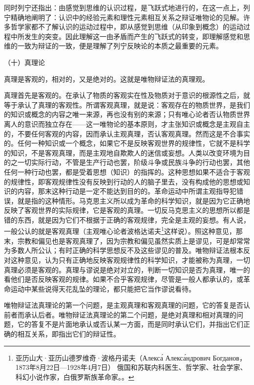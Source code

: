 \documentclass[UTF8, 12pt, a4paper]{ctexrep}
\begin{document}
同时列宁还指出：由感觉到思维的认识过程，是飞跃式地进行的，在这一点上，列宁精确地阐明了：认识中的经验元素和理性元素相互关系之辩证唯物论的见解。许多哲学家都不了解认识的运动过程中，即从感觉到思维（从印象到概念）的运动过程中所发生的突变。因此理解这一由矛盾而产生的飞跃式的转变，即理解感觉和思维的一致为辩证的一致，便是理解了列宁反映论的本质之最重要的元素。

（十）真理论

真理是客观的，相对的，又是绝对的。这就是唯物辩证法的真理观。

真理首先是客观的。在承认了物质的客观实在性及物质对于意识的根源性之后，就等于承认了真理的客观性。所谓客观真理，就是说：客观存在的物质世界，是我们的知识或概念的内容之唯一来源，再也没有别的来源；只有唯心论者否认物质世界离人的意识而独立存在——这一唯物论的基本原则，才主张知识或概念是主观自主的，不要任何客观的内容，因而承认主观真理，否认客观真理。然而这是不合事实的。任何一种知识或一个概念，如果它不是反映客观世界的规律性，它就不是科学的知识，不是客观真理，而是主观地自欺欺人的迷信或妄想。人类以改变环境为目的之一切实际行动，不管是生产行动也罢，阶级斗争或民族斗争的行动也罢，其他任何一种行动也罢，都是受着思想（知识）的指挥的。这种思想如果不适合于客观的规律性，即客观规律性没有反映到行动的人的脑子里去，没有构成他的思想或知识的内容，那末这种行动是一定不能达到目的的。革命运动中所谓主观指导犯错误，就是指的这种情形。马克思主义所以成为革命的科学知识，就是因为它正确地反映了客观世界的实际规律，它是客观的真理。一切反马克思主义的思想所以都是错的东西，就是因为它们不根据于正确的客观规律，完全是主观的妄想。有人说，一般公认的就是客观真理（主观唯心论者波格达诺夫\footnote{亚历山大·亚历山德罗维奇·波格丹诺夫（Алекса́ Алекса́ндрович Богданов，1873年8月22日—1928年4月7日） 俄国和苏联内科医生、哲学家、社会学家、科幻小说作家，白俄罗斯族革命家。。}这样说）。照这种意见，那末，宗教和偏见也是客观真理了，因为宗教和偏见虽然实质上是谬见，可是却常常为多数人所公认；有时正确的科学思想反不及这些谬见的普及。唯物辩证法根本反对这种意见，认为只有正确地反映客观规律性的科学知识，才能被称为真理，一切真理必须是客观的。真理与谬说是绝对对立的，判断一切知识是否为真理，唯一的看他们是否反映客观的规律。如果不合乎客观规律，尽管是一般人都承认的，或革命运动中某些说得天花乱坠的理论，都只能把它当作谬说看待。

唯物辩证法真理论的第一个问题，是主观真理和客观真理的问题，它的答复是否认前者而承认后者。唯物辩证法真理论的第二个问题，是绝对真理和相对真理的问题，它的答复不是片面地承认或否认某一方面，而是同时承认它们，并指出它们正确的相互关系，即指出它们的辩证性。
\end{document}
